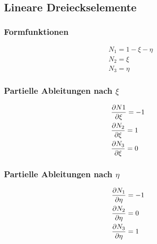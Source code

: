 \label{sec:annex_shape_functions}
\subsection{Lineare Dreieckselemente}
\label{sec:linear_triangles_annex}

\begin{minipage}[t]{0.3\textwidth}
\subsubsection{Formfunktionen}
\begin{align*}
	&N_1 = 1 - \xi - \eta\\
	&N_2 = \xi \\
	&N_3 = \eta
\end{align*}
\end{minipage}
\begin{minipage}[t]{0.3\textwidth}
\subsubsection{Partielle Ableitungen nach $\xi$}
\begin{align*}
&\frac{\partial N1}{\partial \xi} = -1\\
&\frac{\partial N_2}{\partial \xi} = 1\\
&\frac{\partial N_3}{\partial \xi} = 0
\end{align*}
\end{minipage}
\begin{minipage}[t]{0.3\textwidth}
\subsubsection{Partielle Ableitungen nach $\eta$}
\begin{align*}
&\frac{\partial N_1}{\partial \eta} = -1\\
&\frac{\partial N_2}{\partial \eta} = 0\\
&\frac{\partial N_3}{\partial \eta} = 1
\end{align*}
\end{minipage}



